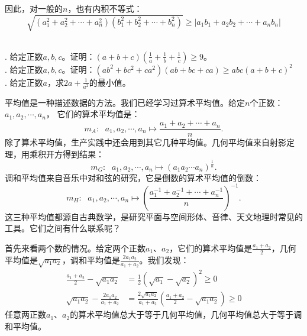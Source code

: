 \documentclass[12pt,UTF8]{ctexbook}
\begin{document}
因此，对一般的$n$，也有内积不等式：
$$ \sqrt{(a_1^2 + a_2^2 + \cdots + a_n^2)(b_1^2 + b_2^2 + \cdots + b_n^2)} \geqslant |a_1b_1 + a_2b_2+ \cdots + a_nb_n|$$

\begin{xt}    
    \mbox{}\\
    . 给定正数$a,b,c$。证明：$(a + b + c)(\frac{1}{a}+\frac{1}{b}+\frac{1}{c}) \geqslant 9$。\\
    . 给定正数$a,b,c$。证明：$(ab^2 + bc^2 + ca^2)(ab + bc + ca) \geqslant abc(a+b+c)^2$ \\
    . 给定正数$a$，求$2a + \frac{1}{a^2}$的最小值。
\end{xt}


平均值是一种描述数据的方法。我们已经学习过算术平均值。给定$n$个正数：$a_1, a_2, \cdots , a_n$，
它们的算术平均值是：
$$ m_A : \;\,\, a_1, a_2, \cdots , a_n \mapsto \frac{a_1 + a_2 + \cdots + a_n}{n}. $$
除了算术平均值，生产实践中还会用到其它几种平均值。几何平均值来自射影定理，用乘积开方得到结果：
$$ m_G :\;\,\, a_1, a_2, \cdots , a_n \mapsto  (a_1a_2\cdots a_n)^{\frac{1}{n}}.$$
调和平均值来自音乐中对和弦的研究，它是倒数的算术平均值的倒数：
$$ m_H : \;\,\, a_1, a_2, \cdots , a_n \mapsto \left(\frac{a_1^{-1} + a_2^{-1} + \cdots + a_n^{-1}}{n}\right)^{-1}. $$
这三种平均值都源自古典数学，是研究平面与空间形体、音律、天文地理时常见的工具。它们之间有什么联系呢？

首先来看两个数的情况。给定两个正数$a_1$、$a_2$，它们的算术平均值是$\frac{a_1 + a_2}{2}$，几何平均值是$\sqrt{a_1a_2}$，调和平均值是$\frac{2a_1a_2}{a_1 + a_2}$。我们发现：
\begin{align*}
    \frac{a_1 + a_2}{2} - \sqrt{a_1a_2} &= \frac{1}{2}(\sqrt{a_1} - \sqrt{a_2})^2 \geqslant 0  \\
    \sqrt{a_1a_2} - \frac{2a_1a_2}{a_1 + a_2} &= \frac{2\sqrt{a_1a_2}}{a_1 + a_2}\left(\frac{a_1 + a_2}{2} - \sqrt{a_1a_2}\right) \geqslant 0 
\end{align*}
任意两正数$a_1$、$a_2$的算术平均值总大于等于几何平均值，几何平均值总大于等于调和平均值。
\end{document}
